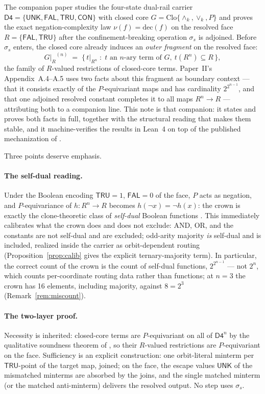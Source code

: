 \documentclass[11pt]{article}
\theoremstyle{remark}
\newcommand{\Dfour}{\ensuremath{\mathsf{D4}}}
\newcommand{\UNK}{\ensuremath{\mathsf{UNK}}}
\newcommand{\FAL}{\ensuremath{\mathsf{FAL}}}
\newcommand{\TRU}{\ensuremath{\mathsf{TRU}}}
\newcommand{\CON}{\ensuremath{\mathsf{CON}}}
\newcommand{\meetk}{\ensuremath{\wedge_k}}
\newcommand{\joink}{\ensuremath{\vee_k}}
\newcommand{\Clo}{\ensuremath{\mathrm{Clo}}}
\newcommand{\GR}{\ensuremath{G|_R}}
\begin{document}
The companion paper \cite{wcy2} studies the four-state dual-rail carrier
$\Dfour=\{\UNK,\FAL,\TRU,\CON\}$ with closed core
$G=\Clo\{\meetk,\joink,P\}$ and proves the exact negation-complexity law
$\nu(f)=\mathrm{dec}(f)$ on the resolved face $R=\{\FAL,\TRU\}$ after the
confinement-breaking operation $\sigma_s$ is adjoined. Before $\sigma_s$
enters, the closed core already induces an \emph{outer fragment} on the
resolved face:
\[
\GR^{(n)} \;=\; \{\, t|_{R^n} \;:\; t \text{ an $n$-ary term of } G,\
t(R^n)\subseteq R \,\},
\]
the family of $R$-valued restrictions of closed-core terms. Paper~II's
Appendix~A.4--A.5 uses two facts about this fragment as boundary context
--- that it consists exactly of the $P$-equivariant maps and has
cardinality $2^{2^{n-1}}$, and that one adjoined resolved constant
completes it to all maps $R^n\to R$ --- attributing both to a companion
line. This note is that companion: it states and proves both facts in
full, together with the structural reading that makes them stable, and it
machine-verifies the results in Lean~4 on top of the published
mechanization of \cite{wcy2}.

Three points deserve emphasis.

\paragraph{The self-dual reading.} Under the Boolean encoding $\TRU=1$,
$\FAL=0$ of the face, $P$ acts as negation, and $P$-equivariance of
$h:R^n\to R$ becomes $h(\neg x)=\neg h(x)$: the crown is exactly the
clone-theoretic class of \emph{self-dual} Boolean functions
\cite{post,lau}. This immediately calibrates what the crown does and does
not exclude: AND, OR, and the constants are not self-dual and are
excluded; odd-arity majority \emph{is} self-dual and is included,
realized inside the carrier as orbit-dependent routing
(Proposition~\ref{prop:calib} gives the explicit ternary-majority term).
In particular, the correct count of the crown is the count of self-dual
functions, $2^{2^{n-1}}$ --- not $2^n$, which counts per-coordinate
routing data rather than functions; at $n=3$ the crown has 16 elements,
including majority, against $8=2^3$ (Remark~\ref{rem:miscount}).

\paragraph{The two-layer proof.} Necessity is inherited: closed-core
terms are $P$-equivariant on all of $\Dfour^n$ by the qualitative
soundness theorem of \cite{wcy2}, so their $R$-valued restrictions are
$P$-equivariant on the face. Sufficiency is an explicit construction:
one orbit-literal minterm per $\TRU$-point of the target map, joined; on
the face, the escape values \UNK{} of the mismatched minterms are
absorbed by the joins, and the single matched minterm (or the matched
anti-minterm) delivers the resolved output. No step uses $\sigma_s$.
\end{document}

